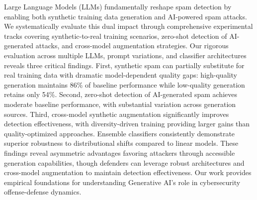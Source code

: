 \label{sec:abstract}
Large Language Models (LLMs) fundamentally reshape spam detection by enabling both synthetic training data generation and AI-powered spam attacks. We systematically evaluate this dual impact through comprehensive experimental tracks covering synthetic-to-real training scenarios, zero-shot detection of AI-generated attacks, and cross-model augmentation strategies. Our rigorous evaluation across multiple LLMs, prompt variations, and classifier architectures reveals three critical findings. First, synthetic spam can partially substitute for real training data with dramatic model-dependent quality gaps: high-quality generation maintains 86\% of baseline performance while low-quality generation retains only 54\%. Second, zero-shot detection of AI-generated spam achieves moderate baseline performance, with substantial variation across generation sources. Third, cross-model synthetic augmentation significantly improves detection effectiveness, with diversity-driven training providing larger gains than quality-optimized approaches. Ensemble classifiers consistently demonstrate superior robustness to distributional shifts compared to linear models. These findings reveal asymmetric advantages favoring attackers through accessible generation capabilities, though defenders can leverage robust architectures and cross-model augmentation to maintain detection effectiveness. Our work provides empirical foundations for understanding Generative AI's role in cybersecurity offense-defense dynamics.
